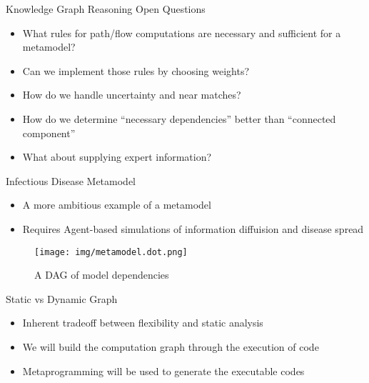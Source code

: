 \documentclass[ignorenonframetext,]{beamer}
\providecommand{\tightlist}{%
  \setlength{\itemsep}{0pt}\setlength{\parskip}{0pt}}
\begin{document}
\begin{frame}{Knowledge Graph Reasoning Open Questions}
\protect\hypertarget{knowledge-graph-reasoning-open-questions}{}

\begin{itemize}
\tightlist
\item
  What rules for path/flow computations are necessary and sufficient for
  a metamodel?
\item
  Can we implement those rules by choosing weights?
\item
  How do we handle uncertainty and near matches?
\item
  How do we determine ``necessary dependencies'' better than ``connected
  component''
\item
  What about supplying expert information?
\end{itemize}

\end{frame}

\begin{frame}{Infectious Disease Metamodel}
\protect\hypertarget{infectious-disease-metamodel}{}

\begin{itemize}
\tightlist
\item
  A more ambitious example of a metamodel
\item
  Requires Agent-based simulations of information diffuision and disease
  spread
\end{itemize}
\begin{figure}
\centering
\texttt{[image: img/metamodel.dot.png]}
\caption{A DAG of model dependencies}
\end{figure}

\end{frame}

\begin{frame}{Static vs Dynamic Graph}
\protect\hypertarget{static-vs-dynamic-graph}{}

\begin{itemize}
\tightlist
\item
  Inherent tradeoff between flexibility and static analysis
\item
  We will build the computation graph through the execution of code
\item
  Metaprogramming will be used to generate the executable codes
\end{itemize}

\end{frame}
\end{document}
